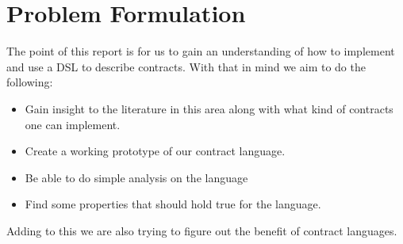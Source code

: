 \documentclass{ituthesis}
\begin{document}
\section{Problem Formulation}
The point of this report is for us to gain an understanding of how to implement and use a DSL to describe contracts. With that in mind we aim to do the following:

\begin{itemize}
    \item Gain insight to the literature in this area along with what kind of contracts one can implement.
    \item Create a working prototype of our contract language.
    \item Be able to do simple analysis on the language
    \item Find some properties that should hold true for the language.
\end{itemize}

Adding to this we are also trying to figure out the benefit of contract languages.


\end{document}
